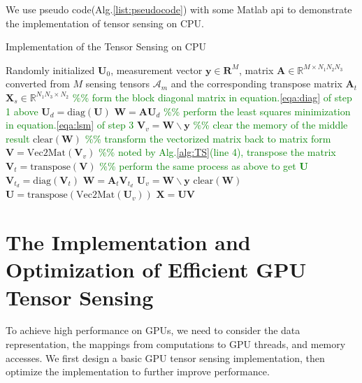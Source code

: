 \documentclass[futureinternet,article,submit,moreauthors,pdftex,10pt,a4paper]{Definitions/mdpi}
\theoremstyle{plain}
\theoremstyle{definition}
\theoremstyle{remark}
\begin{document}
We use pseudo code(Alg.\ref{list:pseudocode}) with some Matlab api to demonstrate the implementation of tensor sensing on CPU.
\begin{algorithm}
\caption{Implementation of the Tensor Sensing on CPU}
\label{list:pseudocode}
\begin{algorithmic}[1]
    \Require Randomly initialized $\mathbf{U}_0$, measurement vector $\mathbf{y} \in \mathbf{R}^M$, matrix $\mathbf{A} \in \mathbb{R}^{M \times N_1N_2N_3}$ converted from $M$ sensing tensors $\mathcal{A}_m$ and the corresponding transpose matrix $\mathbf{A}_t$
    \Ensure $\mathbf{X}_s \in \mathbb{R}^{N_1N_3 \times N_2}$
    \State \textcolor{green}{\%\% form the block diagonal matrix in equation.\ref{eqa:diag} of step 1 above}
    \State $\mathbf{U}_{d} = \text{diag}(\mathbf{U})$ 
        \State $\mathbf{W} = \mathbf{A} \mathbf{U}_{d}$
        \State \textcolor{green}{\%\% perform the least squares minimization in equation.\ref{eqa:lsm} of step 3}
        \State $\mathbf{V}_{v} = \mathbf{W} \backslash \mathbf{y}$
        \State \textcolor{green}{\%\% clear the memory of the middle result}
        \State $\text{clear}(\mathbf{W})$
        \State \textcolor{green}{\%\% transform the vectorized matrix back to matrix form}
        \State $\mathbf{V} = \text{Vec2Mat}(\mathbf{V}_{v})$
        \State \textcolor{green}{\%\% noted by Alg.\ref{alg:TS}(line 4), transpose the matrix}
        \State $\mathbf{V}_t = \text{transpose}(\mathbf{V})$
        \State \textcolor{green}{\%\% perform the same process as above to get $\mathbf{U}$}
        \State $\mathbf{V}_{t_{d}} = \text{diag}(\mathbf{V}_t)$
        \State $\mathbf{W} = \mathbf{A}_t \mathbf{V}_{t_{d}}$
        \State $\mathbf{U}_{v} = \mathbf{W} \backslash \mathbf{y}$
        \State $\text{clear}(\mathbf{W})$
        \State $\mathbf{U} = \text{transpose}(\text{Vec2Mat}(\mathbf{U}_{v}))$
    \EndFor
    \State \Return $\mathbf{X} = \mathbf{U} \mathbf{V}$
    \end{algorithmic}
    \end{algorithm}
\section{The Implementation and Optimization of Efficient GPU Tensor Sensing}
\label{SEC_GPU}
To achieve high performance on GPUs, we need to consider the data representation, the mappings from computations to GPU threads, and memory accesses. We first design a basic GPU tensor sensing implementation, then optimize the implementation to further improve performance.
\end{document}
